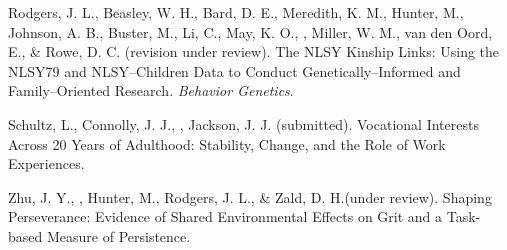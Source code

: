 \item Rodgers, J. L., Beasley, W. H., Bard, D. E., Meredith, K. M., Hunter, M., Johnson, A. B., Buster, M., Li, C., May, K. O., \meb, Miller, W. M., van den Oord, E., \& Rowe, D. C. (revision under review). The NLSY Kinship Links: Using the NLSY79 and NLSY--Children Data to Conduct Genetically--Informed and Family--Oriented Research. \textit{Behavior Genetics}.
\item Schultz, L., Connolly, J. J., \meb, Jackson, J. J. (submitted). Vocational Interests Across 20 Years of Adulthood: Stability, Change, and the Role of Work Experiences. %
\item Zhu, J. Y., \meb, Hunter, M., Rodgers, J. L., \& Zald, D. H.(under review). Shaping Perseverance: Evidence of Shared Environmental Effects on Grit and a Task-based Measure of Persistence.%
\vspace{-2mm}\begin{center}\end{center} \vspace{-4mm}